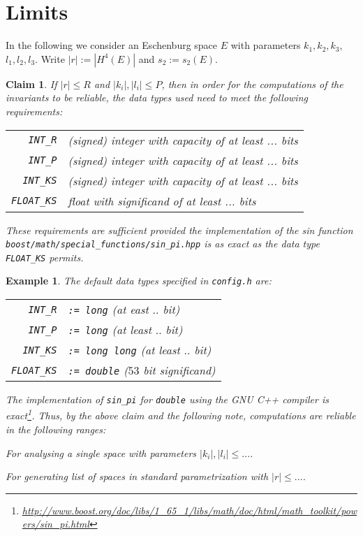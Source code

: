 \documentclass{article}
\newtheorem{eg}[thm]{Example}
\newtheorem{claim}[thm]{Claim}
\newcommand{\abs}[1]{\left|#1\right|}
\begin{document}
\section*{Limits}
In the following we consider an Eschenburg space \(E\) with parameters \(k_1,k_2,k_3\), \(l_1,l_2,l_3\).  Write \(\abs{r} := |H^4(E)|\) and \(s_2 := s_2(E)\).

\begin{claim}
  If \(\abs{r} \leq R\) and \(\abs{k_i},\abs{l_i} \leq P\), then in order for the computations of the invariants to be reliable, the data types used need to meet the following requirements:
  \begin{center}
    \begin{tabular}{rp{20em}}
      \verb+INT_R+ & (signed) integer with capacity of at least ... bits \\
      \verb+INT_P+ & (signed) integer with capacity of at least ... bits \\
      \verb+INT_KS+ & (signed) integer with capacity of at least ... bits \\
      \verb+FLOAT_KS+ & float with significand of at least ... bits
    \end{tabular}
  \end{center}
  These requirements are sufficient provided the implementation of the sin function  \verb+boost/math/special_functions/sin_pi.hpp+
  is as exact as the data type \verb+FLOAT_KS+ permits.
\end{claim}

\begin{eg}
  The default data types specified in \verb+config.h+ are:
  \begin{center}
    \begin{tabular}{rp{20em}}
      \verb+INT_R+ & \texttt{:= long} (at east $..$ bit) \\
      \verb+INT_P+ & \texttt{:= long} (at least $..$ bit) \\
      \verb+INT_KS+ & \texttt{:= long long} (at least $..$ bit) \\
      \verb+FLOAT_KS+ & \texttt{:= double} ($53$ bit significand)
    \end{tabular}
  \end{center}
  The implementation of \verb+sin_pi+ for \texttt{double} using the GNU C++ compiler is exact\footnote{%
    \url{http://www.boost.org/doc/libs/1_65_1/libs/math/doc/html/math_toolkit/powers/sin_pi.html}}.
  Thus, by the above claim and the following note, computations are reliable in the following ranges:
  \begin{compactitem}
  \item For analysing a single space with parameters \(\abs{k_i}, \abs{l_i} \leq ...\).

  \item  For generating list of spaces in standard parametrization with \(\abs{r} \leq ...\).    
  \end{compactitem}
\end{eg}
\end{document}

